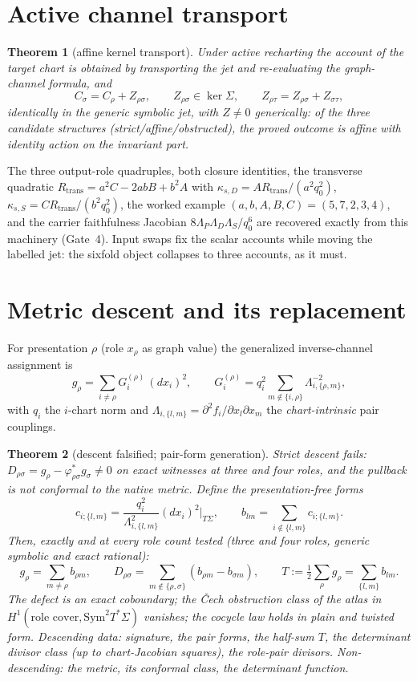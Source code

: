 \documentclass[11pt]{article}
\newtheorem{theorem}{Theorem}
\theoremstyle{definition}
\newcommand{\Sig}{\Sigma}
\begin{document}
\section{Active channel transport}
\begin{theorem}[affine kernel transport]\label{thm:C}
Under active recharting the account of the target chart is obtained by
transporting the jet and re-evaluating the graph-channel formula, and
\[
C_\sigma=C_\rho+Z_{\rho\sigma},\qquad Z_{\rho\sigma}\in\ker\Sigma,\qquad
Z_{\rho\tau}=Z_{\rho\sigma}+Z_{\sigma\tau},
\]
identically in the generic symbolic jet, with $Z\neq0$ generically: of the three
candidate structures (strict/affine/obstructed), the proved outcome is
\emph{affine} with identity action on the invariant part.
\end{theorem}

The three output-role quadruples, both closure identities, the transverse quadratic
$R_{\mathrm{trans}}=a^2C-2abB+b^2A$ with $\kappa_{s,D}=AR_{\mathrm{trans}}/(a^2q_0^2)$,
$\kappa_{s,S}=CR_{\mathrm{trans}}/(b^2q_0^2)$, the worked example
$(a,b,A,B,C)=(5,7,2,3,4)$, and the carrier faithfulness Jacobian
$8\Lambda_P\Lambda_D\Lambda_S/q_0^6$ are recovered exactly from this machinery
(Gate~4). Input swaps fix the scalar accounts while moving the labelled jet: the
sixfold object collapses to three accounts, as it must.

\section{Metric descent and its replacement}\label{sec:descent}
For presentation $\rho$ (role $x_\rho$ as graph value) the generalized
inverse-channel assignment is
\[
g_\rho=\sum_{i\neq\rho}G^{(\rho)}_i\,(dx_i)^2,\qquad
G^{(\rho)}_i=q_i^2\!\!\sum_{m\notin\{i,\rho\}}\!\Lambda_{i,\{\rho,m\}}^{-2},
\]
with $q_i$ the $i$-chart norm and $\Lambda_{i,\{l,m\}}=\partial^2f_i/\partial
x_l\partial x_m$ the \emph{chart-intrinsic} pair couplings.

\begin{theorem}[descent falsified; pair-form generation]\label{thm:E}
Strict descent fails: $D_{\rho\sigma}=g_\rho-\varphi^*_{\rho\sigma}g_\sigma\neq0$
on exact witnesses at three and four roles, and the pullback is not conformal to
the native metric. Define the presentation-free forms
\[
c_{i;\{l,m\}}=\frac{q_i^2}{\Lambda_{i,\{l,m\}}^2}(dx_i)^2\Big|_{T\Sig},\qquad
b_{lm}=\sum_{i\notin\{l,m\}}c_{i;\{l,m\}} .
\]
Then, exactly and at every role count tested (three and four roles, generic
symbolic and exact rational):
\[
g_\rho=\sum_{m\neq\rho}b_{\rho m},\qquad
D_{\rho\sigma}=\!\!\sum_{m\notin\{\rho,\sigma\}}\!\!(b_{\rho m}-b_{\sigma m}),\qquad
T:=\tfrac12\sum_\rho g_\rho=\sum_{\{l,m\}}b_{lm}.
\]
The defect is an exact coboundary; the \v Cech obstruction class of the atlas in
$H^1(\text{role cover},\mathrm{Sym}^2T^*\Sig)$ vanishes; the cocycle law holds in
plain and twisted form. Descending data: signature, the pair forms, the half-sum
$T$, the determinant divisor class (up to chart-Jacobian squares), the role-pair
divisors. Non-descending: the metric, its conformal class, the determinant
function.
\end{theorem}
\end{document}
